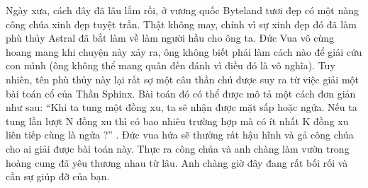 Ngày xưa, cách đây đã lâu lắm rồi, ở vương quốc Byteland tươi đẹp có một nàng công chúa xinh đẹp tuyệt trần. Thật không may, chính vì sự xinh   đẹp đó đã làm phù thủy Astral đã bắt làm về làm người hầu cho ông ta. Đức Vua vô cùng hoang mang khi chuyện này xảy ra, ông không biết phải làm   cách nào để giải cứu con mình (ông không thể mang quân đến đánh vì điều đó là vô nghĩa). Tuy nhiên, tên phù thủy này lại rất sợ một câu thần chú được   suy ra từ việc giải một bài toán cổ của Thần Sphinx. Bài toán đó có thể được mô tả một cách đơn giản như sau: “Khi ta tung một đồng xu, ta sẽ nhận   được mặt sấp hoặc ngửa. Nếu ta tung lần lượt N đồng xu thì có bao nhiêu trường hợp mà có ít nhất K đồng xu liên tiếp cùng là ngửa ?” . Đức vua hứa   sẽ thưởng rất hậu hĩnh và gả công chúa cho ai giải được bài toán này. Thực ra công chúa và anh chàng làm vườn trong hoàng cung đã yêu thương nhau   từ lâu. Anh chàng giờ đây đang rất bối rối và cần sự giúp đỡ của bạn.